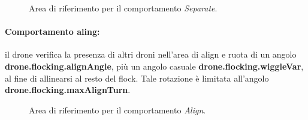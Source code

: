 \begin{figure}[H] 
    \captionsetup{justification=centering, margin=2cm, font=footnotesize}
    \begin{center}
    \end{center}
    \caption{Area di riferimento per il comportamento \textit{Separate}.}
    \label{separate}
\end{figure}

\paragraph{Comportamento aling:} il drone verifica la presenza di altri droni nell'area di align e ruota di un angolo \textbf{drone.flocking.alignAngle}, più un angolo casuale \textbf{drone.flocking.wiggleVar}, al fine di allinearsi al resto del flock.
Tale rotazione è limitata all'angolo  \textbf{drone.flocking.maxAlignTurn}.

\begin{figure}[H] 
    \captionsetup{justification=centering, margin=2cm, font=footnotesize}
    \begin{center}
    \end{center}
    \caption{Area di riferimento per il comportamento \textit{Align}.}
    \label{align}
\end{figure}

